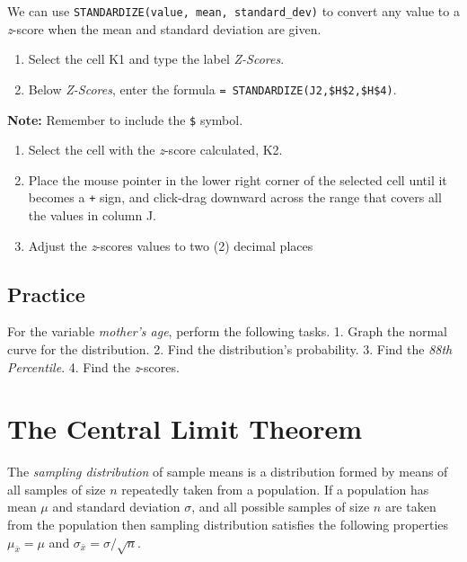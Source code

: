 \documentclass[
]{book}
\providecommand{\tightlist}{%
  \setlength{\itemsep}{0pt}\setlength{\parskip}{0pt}}
\begin{document}
We can use \texttt{STANDARDIZE(value,\ mean,\ standard\_dev)} to convert any value to a \emph{z}-score when the mean and standard deviation are given.

\begin{enumerate}
\def\labelenumi{\arabic{enumi}.}
\tightlist
\item
  Select the cell K1 and type the label \emph{Z-Scores}.
\item
  Below \emph{Z-Scores}, enter the formula \texttt{=\ STANDARDIZE(J2,\$H\$2,\$H\$4)}.
\end{enumerate}

\textbf{Note:} Remember to include the \texttt{\$} symbol.

\begin{enumerate}
\def\labelenumi{\arabic{enumi}.}
\setcounter{enumi}{2}
\tightlist
\item
  Select the cell with the \emph{z}-score calculated, K2.
\item
  Place the mouse pointer in the lower right corner of the selected cell until it becomes a \texttt{+} sign, and click-drag downward across the range that covers all the values in column J.
\item
  Adjust the \emph{z}-scores values to two (2) decimal places
\end{enumerate}

\hypertarget{practice-9}{%
\section{Practice}\label{practice-9}}

For the variable \emph{mother's age}, perform the following tasks.
1. Graph the normal curve for the distribution.
2. Find the distribution's probability.
3. Find the \emph{88th Percentile}.
4. Find the \emph{z}-scores.

\hypertarget{the-central-limit-theorem}{%
\chapter{The Central Limit Theorem}\label{the-central-limit-theorem}}

The \emph{sampling distribution} of sample means is a distribution formed by means of all samples of size \(n\) repeatedly taken from a population. If a population has mean \(\mu\) and standard deviation \(\sigma\), and all possible samples of size \(n\) are taken from the population then sampling distribution satisfies the following properties \(\mu_{\bar{x}}=\mu\) and \(\sigma_{\bar{x}}=\sigma/\sqrt{n}\).
\end{document}
